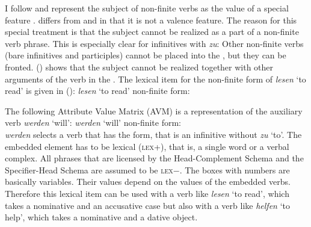I follow
\citet[Section~3.1.1]{Kiss95a} and represent the subject of non-finite verbs as the value of a
special feature \subj. \subj differs from \spr and \comps in that it is not a valence feature. The
reason for this special treatment is that the subject cannot be realized as a part of a non-finite
verb phrase. This is especially clear for infinitives with \emph{zu}:
\eal
{}
\zl
Other non-finite verbs (bare infinitives and participles) cannot be placed into the \nf, but they
can be fronted. () shows that the subject cannot be realized together with other arguments
of the verb in the \vf.
\eal
{}
\zl
The lexical item for the non-finite form of \emph{lesen} `to read' is given in ():
\ea
\emph{lesen} `to read' non-finite form:\\
\z

The following Attribute Value Matrix (AVM) is a representation of the auxiliary verb \emph{werden} `will':
\eas
\emph{werden} `will' non-finite form:\\
\zs
\emph{werden} selects a verb that has the  form, that is an infinitive without \emph{zu}
`to'. The embedded element has to be lexical (\textsc{lex}+), that is, a single word or a verbal
complex. All phrases that are licensed by the Head-Complement Schema and the Specifier-Head Schema
are assumed to be \textsc{lex}$-$.
The boxes with numbers are basically variables. Their values depend on the values of the
embedded verbs. Therefore this lexical item can be used with a verb like \emph{lesen} `to read',
which takes a nominative and an accusative case but also with a verb like \emph{helfen} `to help',
which takes a nominative and a dative object.

